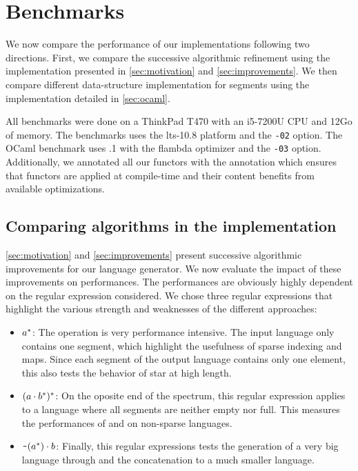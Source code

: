 \section{Benchmarks}
\label{sec:bench}

We now compare the performance of our implementations following two directions.
First, we compare the successive algorithmic refinement using the \haskell
implementation presented in \cref{sec:motivation} and \cref{sec:improvements}.
We then compare different data-structure implementation for segments
using the \ocaml implementation detailed in \cref{sec:ocaml}.

All benchmarks were done on a ThinkPad T470 with an i5-7200U CPU and 12Go of memory.
The \haskell benchmarks uses the lts-10.8 platform and the \texttt{-02} option.
The OCaml benchmark uses .1 with the flambda optimizer and the
\texttt{-03} option. Additionally, we annotated all our functors
with the \code{[@inline]} annotation which ensures that functors are applied at
compile-time and their content benefits from available optimizations.

\subsection{Comparing algorithms in the \haskell implementation}

\cref{sec:motivation} and \cref{sec:improvements} present successive
algorithmic improvements for our language generator. We now evaluate
the impact of these improvements on performances.
The performances are obviously highly dependent on the regular expression
considered. We chose three regular expressions that highlight
the various strength and weaknesses of the different approaches:
\begin{itemize}
\item$a^*$: The  operation is very performance intensive.
  The input language only contains one segment, which highlight the usefulness
  of sparse indexing and maps. Since each segment of the output language contains
  only one element, this also tests the behavior of star at high length.
\item $(a \cdot{b^*})^*$: On the oposite end of the spectrum, this
  regular expression applies  to a language where all segments
  are neither empty nor full. This measures the performances of 
  and  on non-sparse languages.
\item $\texttt{\textasciitilde}{(a^*)} \cdot{b}$: Finally, this regular expressions
  tests the generation of a very big language through  and the
  concatenation to a much smaller language.
\end{itemize}


